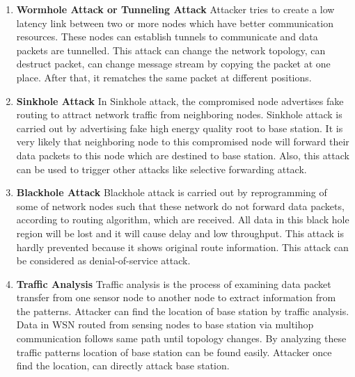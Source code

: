 \begin{enumerate}[label=\textbf{\roman*.}]
    \item \textbf{Wormhole Attack or Tunneling Attack} \cite{singh2014survey} Attacker tries to create a low latency link between two or more nodes which have better communication resources. These nodes can establish tunnels to communicate and data packets are tunnelled. This attack can change the network topology, can destruct packet, can change message stream by copying the packet at one place. After that, it rematches the same packet at different positions.
    
    \item \textbf{Sinkhole Attack }\cite{salehi2013detection} In Sinkhole attack, the compromised node advertises fake routing to attract network traffic from neighboring nodes. Sinkhole attack is carried out by advertising fake high energy quality root to base station. It is very likely that neighboring node to this compromised node will forward their data packets to this node which are destined to base station. Also, this attack can be used to trigger other attacks like selective forwarding attack. 

    \item \textbf{Blackhole Attack }\cite{wazid2013detection} Blackhole attack is carried out by reprogramming of some of network nodes such that these network do not forward data packets, according to routing algorithm, which are received. All data in this black hole region will be lost and it will cause delay and low throughput. This attack is hardly prevented because it shows original route information. This attack can be considered as denial-of-service attack.
    
    
    \item \textbf{Traffic Analysis }\cite{deng2005countermeasures} Traffic analysis is the process of examining data packet transfer from one sensor node to another node to extract information from the patterns. Attacker can find the location of base station by traffic analysis. Data in WSN routed from sensing nodes to base station via multihop communication follows same path until topology changes. By analyzing these traffic patterns location of base station can be found easily. Attacker once find the location, can directly attack base station.
    

\end{enumerate}
